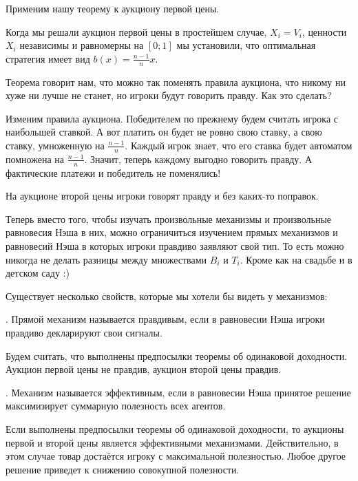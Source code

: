 Применим нашу теорему к аукциону первой цены.

\begin{myex} Когда мы решали аукцион первой цены в простейшем случае, $ X_{i}=V_{i} $, ценности $ X_{i} $ независимы и равномерны на $ [0;1] $ мы установили, что оптимальная стратегия имеет вид $ b(x)=\frac{n-1}{n} x$.

Теорема говорит нам, что можно так поменять правила аукциона, что никому ни хуже ни лучше не станет, но игроки будут говорить правду. Как это сделать?

Изменим правила аукциона. Победителем по прежнему будем считать игрока с наибольшей ставкой. А вот платить он будет не ровно свою ставку, а свою ставку, умноженную на $ \frac{n-1}{n} $. Каждый игрок знает, что его ставка будет автоматом помножена на $ \frac{n-1}{n} $. Значит, теперь каждому выгодно говорить правду. А фактические платежи и победитель не поменялись!
\end{myex}

На аукционе второй цены игроки говорят правду и без каких-то поправок.

Теперь вместо того, чтобы изучать произвольные механизмы и произвольные равновесия Нэша в них, можно ограничиться изучением прямых механизмов и равновесий Нэша в которых игроки правдиво заявляют свой тип. То есть можно никогда не делать разницы между множествами $ B_{i} $ и $ T_{i} $. Кроме как на свадьбе и в детском саду :)

Существует несколько свойств, которые мы хотели бы видеть у механизмов:

\begin{mydef}
. Прямой механизм называется правдивым, если в равновесии Нэша игроки правдиво декларируют свои сигналы.
\end{mydef}

\begin{myex}
Будем считать, что выполнены предпосылки теоремы об одинаковой доходности. Аукцион первой цены не правдив, аукцион второй цены правдив.
\end{myex}

\begin{mydef} . Механизм называется эффективным, если в равновесии Нэша принятое решение максимизирует суммарную полезность всех агентов.
\end{mydef}

\begin{myex} Если выполнены предпосылки теоремы об одинаковой доходности, то аукционы первой и второй цены является эффективными механизмами. Действительно, в этом случае товар достаётся игроку с максимальной полезностью. Любое другое решение приведет к снижению совокупной полезности.
\end{myex}

